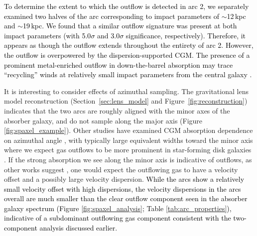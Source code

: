 \documentclass[twocolumn]{aastex62}
\begin{document}
\textcolor{black}{To determine the extent to which the outflow is detected in arc 2, we separately examined two halves of the arc corresponding to impact parameters of $\sim$12\,kpc and $\sim$19\,kpc. We found that a similar outflow signature was present at both impact parameters (with 5.0$\sigma$ and 3.0$\sigma$ significance, respectively). Therefore, it appears as though the outflow extends throughout the entirety of arc 2. 
However, the outflow is overpowered by the \textcolor{black}{dispersion-supported} CGM. %
The presence of a prominent metal-enriched outflow in down-the-barrel absorption may trace ``recycling'' winds at relatively small impact parameters from the central galaxy \citep[e.g.,][]{Oppenheimer2010, Hafen2019b}.}

It is interesting to consider effects of azimuthal sampling. The gravitational lens model reconstruction (Section~\ref{sec:lens_model} and Figure~\ref{fig:reconstruction}) indicates that the two arcs are roughly aligned with the minor axes of the absorber galaxy, and do not sample along the major axis (Figure \ref{fig:spaxel_example}). Other studies have examined CGM absorption dependence on azimuthal angle \citep{Bordoloi2011, LanMo2018, Martin2019}, with typically large equivalent widths toward the minor axis where we expect gas outflows to be more prominent in star-forming disk galaxies \citep{Veilleux2005}. 
If the strong absorption we see along the minor axis is indicative of outflows, as other works suggest \citep[e.g.,][]{Bordoloi2011, Bouche2012, Kacprzak2012, Lan2014, LanMo2018}, one would expect the outflowing gas to have a velocity offset and a possibly large velocity dispersion. \textcolor{black}{While the arcs show a relatively small velocity offset with high dispersions, the velocity dispersions in the arcs overall are much smaller than the clear outflow component seen in the absorber galaxy spectrum (Figure \ref{fig:spaxel_analysis}; Table \ref{tab:arc_properties}), indicative of a subdominant outflowing gas component consistent with the two-component analysis discussed earlier. }
\end{document}
